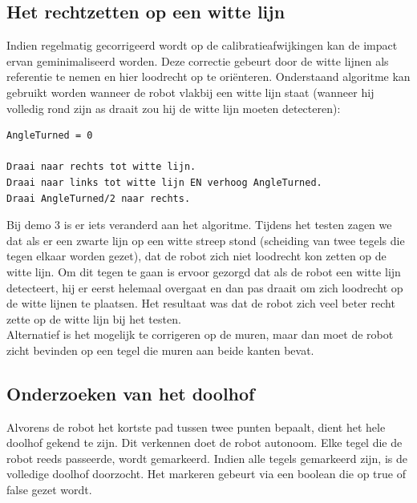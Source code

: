 \documentclass[tt3]{penoverslag}
\begin{document}
\subsection{Het rechtzetten op een witte lijn} %
\label{ssec:algoWitteL}
Indien regelmatig gecorrigeerd wordt op de calibratieafwijkingen kan de impact ervan geminimaliseerd worden. Deze correctie gebeurt door de witte lijnen als referentie te nemen en hier loodrecht op te ori\"enteren.
Onderstaand algoritme kan gebruikt worden wanneer de robot vlakbij een witte lijn staat (wanneer hij volledig rond zijn as draait zou hij de witte lijn moeten detecteren):

\lstset{frame=single, caption=Witte Lijn algoritme (pseudocode),
		label=code:algoWitteL, numbers=left, numberstyle=\footnotesize,
		basicstyle=\sffamily, numbersep=5pt}
\begin{lstlisting}
AngleTurned = 0

Draai naar rechts tot witte lijn.
Draai naar links tot witte lijn EN verhoog AngleTurned.
Draai AngleTurned/2 naar rechts.
\end{lstlisting}

Bij demo 3 is er iets veranderd aan het algoritme. Tijdens het testen zagen we dat als er een zwarte lijn op een witte streep stond (scheiding van twee tegels die tegen elkaar worden gezet), dat de robot zich niet loodrecht kon zetten op de witte lijn. Om dit tegen te gaan is ervoor gezorgd dat als de robot een witte lijn detecteert, hij er eerst helemaal overgaat en dan pas draait om zich loodrecht op de witte lijnen te plaatsen. Het resultaat was dat de robot zich veel beter recht zette op de witte lijn bij het testen.\\

Alternatief is het mogelijk te corrigeren op de muren, maar dan moet de robot zicht bevinden op een tegel die muren aan beide kanten bevat.


\subsection{Onderzoeken van het doolhof} %
\label{ssec:algoOnderzDoolhof}
Alvorens de robot het kortste pad tussen twee punten bepaalt, dient het hele doolhof gekend te zijn. Dit verkennen doet de robot autonoom. Elke tegel die de robot reeds passeerde, wordt gemarkeerd. Indien alle tegels gemarkeerd zijn, is de volledige doolhof doorzocht. Het markeren gebeurt via een boolean die op true of false gezet wordt.
\end{document}
